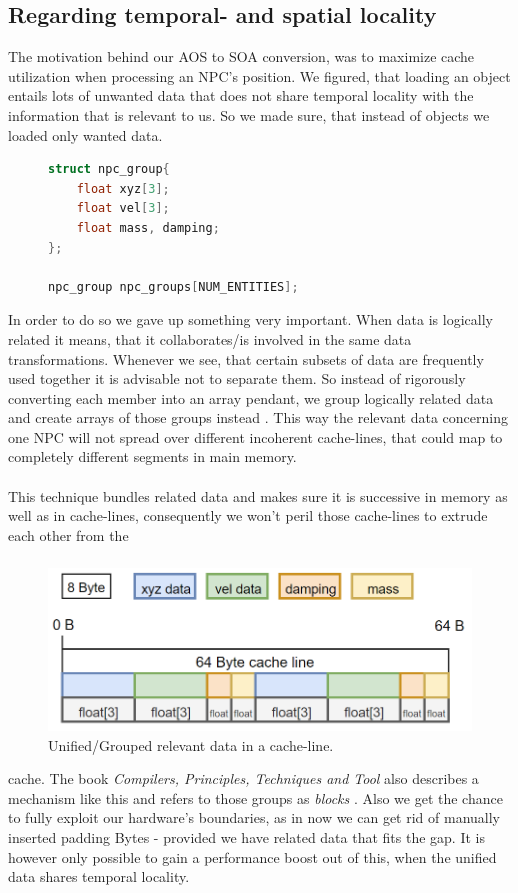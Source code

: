 \subsection{Regarding temporal- and spatial locality}\label{rtasl}
The motivation behind our AOS to SOA conversion, was to maximize cache utilization when processing an NPC's position. We figured, that loading an object entails lots of unwanted data that does not share temporal locality with the information that is relevant to us. So we made sure, that instead of objects we loaded only wanted data.
\begin{figure}
\begin{lstlisting}[language=C++,numbers=none,name={Consolidating related data},label={component_npc}]
struct npc_group{
	float xyz[3];
	float vel[3];
	float mass, damping;
};

npc_group npc_groups[NUM_ENTITIES];
\end{lstlisting}
\end{figure}
In order to do so we gave up something very important. When data is logically related it means, that it collaborates/is involved in the same data transformations. Whenever we see, that certain subsets of data are frequently used together it is advisable not to separate them. So instead of rigorously converting each member into an array pendant, we group logically related data and create arrays of those groups instead . This way the relevant data concerning one NPC will not spread over different incoherent cache-lines, that could map to completely different segments in main memory.\\\\
This technique bundles related data and makes sure it is successive in memory as well as in cache-lines, consequently we won't peril those cache-lines to extrude each other from the 
\subsubsection{}
\vspace{-1cm}
\begin{figure}
	\vspace{-0.4cm}
	\centering
	\includegraphics[width=.37\textwidth, height=0.17\textwidth]{PICs/CacheUtilizationNPCComp}
	\caption{Unified/Grouped relevant data in a cache-line.}\label{cache_utilization_comp}
\end{figure}
cache. The book \textit{Compilers, Principles, Techniques and Tool} also describes a mechanism like this and refers to those groups as \textit{blocks} . Also we get the chance to fully exploit our hardware's boundaries, as in now we can get rid of manually inserted padding Bytes  - provided we have related data that fits the gap. It is however only possible to gain a performance boost out of this, when the unified data shares temporal locality.

